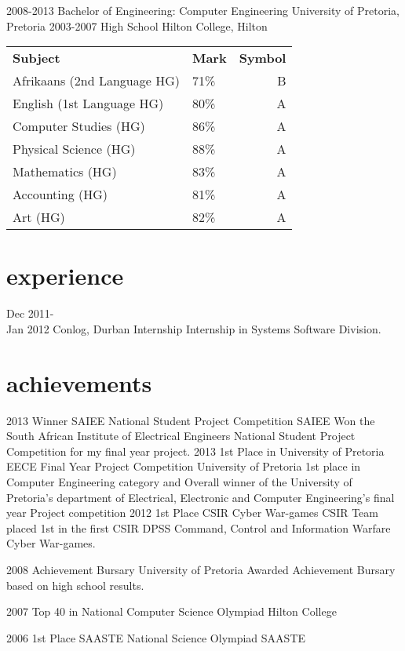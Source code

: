 \documentclass[a4paper]{friggeri-cv}
\begin{document}
\begin{entrylist}
  \entry
    {2008-2013}
    { Bachelor of Engineering: Computer Engineering}
    {University of Pretoria, Pretoria}
    {}
  \entry
    {2003-2007}
    { High School}
    {Hilton College, Hilton}
    { \begin{tabular}{p{5cm} p{1.5cm} r}
    		\textbf{Subject} & \textbf{Mark} & \textbf{Symbol}\\   		Afrikaans (2nd Language HG) & 71\% & B\\
    		English (1st Language HG) & 80\% & A\\
    		Computer Studies (HG) & 86\% & A\\
    		Physical Science (HG) & 88\% & A\\
    		Mathematics (HG) & 83\% & A\\
    		Accounting (HG) & 81\% & A\\
    		Art (HG) & 82\% & A\\
	\end{tabular}}
\end{entrylist}

\section{experience}

\begin{entrylist}
  \entry
    {Dec 2011-\\ Jan 2012}
    {Conlog, Durban}
    {Internship}
    {Internship in Systems Software Division.}
\end{entrylist}

\section{achievements}

\begin{entrylist}
	\entry
	{2013}
	{Winner SAIEE National Student Project Competition}
	{SAIEE}
	{Won the South African Institute of Electrical Engineers National Student Project Competition for my final year project.}
	\entry
	{2013}
	{1st Place in University of Pretoria EECE Final Year Project Competition}
	{University of Pretoria}
	{1st place in Computer Engineering category and Overall winner of the University of Pretoria's department of Electrical, Electronic and Computer Engineering's final year Project competition}
	\entry
	{2012}
	{1st Place CSIR Cyber War-games}
	{CSIR}
	{Team placed 1st in the first CSIR DPSS Command, Control and Information Warfare Cyber War-games.}
	
	\entry
	{2008}
	{Achievement Bursary}
	{University of Pretoria}
	{Awarded Achievement Bursary based on high school results.}
	
\end{entrylist}
\begin{entrylist}
	
	\entry
	{2007}
	{Top 40 in National Computer Science Olympiad}
	{Hilton College}
	{}
	
	\entry
	{2006}
	{1st Place SAASTE National Science Olympiad}
	{SAASTE}
	{}

\end{entrylist}
\end{document}
